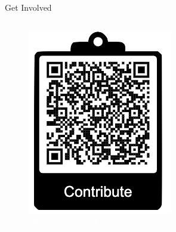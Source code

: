 \documentclass[aspectratio=169]{beamer}
\begin{document}
\begin{frame}[shrink=10]{Get Involved \; \faRocket}
\begin{columns}[T]
    
    \vspace{0mm}
    \begin{figure}
      \centering
      \includegraphics[width=\textwidth]{images/contribute.png}
      \caption*{\footnotesize \textcolor{white}{github.com/range42}}
    \end{figure}
  \end{columns}
\end{frame}
\end{document}
